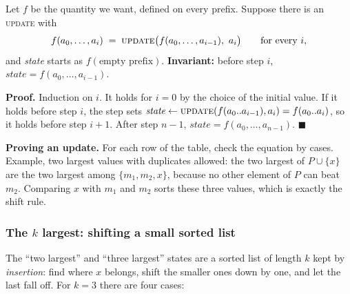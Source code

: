 \begin{invariantbox}
Let $f$ be the quantity we want, defined on every prefix. Suppose there is an \textsc{update} with
\[
f(a_0, \dots, a_{i}) \;=\; \textsc{update}\big(f(a_0, \dots, a_{i-1}),\ a_i\big) \qquad\text{for every } i,
\]
and \textit{state} starts as $f(\text{empty prefix})$. \textbf{Invariant:} before step $i$, $\textit{state} = f(a_0, \dots, a_{i-1})$.

\textbf{Proof.} Induction on $i$. It holds for $i = 0$ by the choice of the initial value. If it holds before step $i$, the step sets $\textit{state} \gets \textsc{update}(f(a_0..a_{i-1}), a_i) = f(a_0..a_i)$, so it holds before step $i+1$. After step $n-1$, $\textit{state} = f(a_0, \dots, a_{n-1})$. \hfill$\blacksquare$

\textbf{Proving an update.} For each row of the table, check the equation by cases. Example, two largest values with duplicates allowed: the two largest of $P \cup \{x\}$ are the two largest among $\{m_1, m_2, x\}$, because no other element of $P$ can beat $m_2$. Comparing $x$ with $m_1$ and $m_2$ sorts these three values, which is exactly the shift rule.
\end{invariantbox}

\subsubsection*{The $k$ largest: shifting a small sorted list}

The ``two largest'' and ``three largest'' states are a sorted list of length $k$ kept by \emph{insertion}: find where $x$ belongs, shift the smaller ones down by one, and let the last fall off. For $k = 3$ there are four cases:

